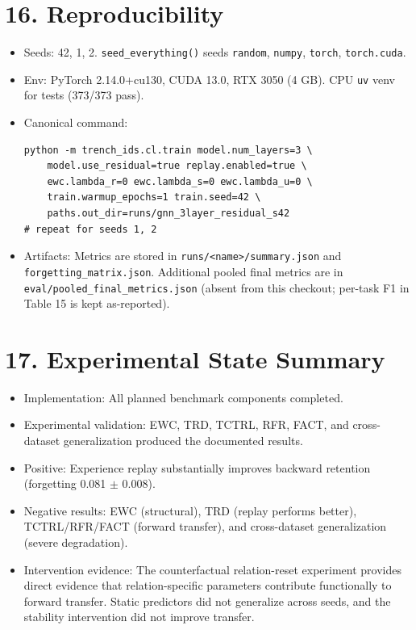 \documentclass[11pt,a4paper]{article}
\begin{document}
\section*{16. Reproducibility}
\begin{itemize}[leftmargin=*]
\item Seeds: 42, 1, 2. \texttt{seed\_everything()} seeds \texttt{random}, \texttt{numpy}, \texttt{torch}, \texttt{torch.cuda}.
\item Env: PyTorch 2.14.0+cu130, CUDA 13.0, RTX 3050 (4 GB). CPU \texttt{uv} venv for tests (373/373 pass).
\item Canonical command:
\begin{verbatim}
python -m trench_ids.cl.train model.num_layers=3 \
    model.use_residual=true replay.enabled=true \
    ewc.lambda_r=0 ewc.lambda_s=0 ewc.lambda_u=0 \
    train.warmup_epochs=1 train.seed=42 \
    paths.out_dir=runs/gnn_3layer_residual_s42
# repeat for seeds 1, 2
\end{verbatim}
\item Artifacts: Metrics are stored in \texttt{runs/<name>/summary.json} and \texttt{forgetting\_matrix.json}.
Additional pooled final metrics are in \texttt{eval/pooled\_final\_metrics.json} (absent from this checkout; per-task F1 in Table 15 is kept as-reported).
\end{itemize}

\section*{17. Experimental State Summary}
\begin{itemize}[leftmargin=*]
\item Implementation: All planned benchmark components completed.
\item Experimental validation: EWC, TRD, TCTRL, RFR, FACT, and cross-dataset generalization produced the documented results.
\item Positive: Experience replay substantially improves backward retention (forgetting \num{0.081} $\pm$ \num{0.008}).
\item Negative results: EWC (structural), TRD (replay performs better), TCTRL/RFR/FACT (forward transfer), and cross-dataset generalization (severe degradation).
\item Intervention evidence: The counterfactual relation-reset experiment provides direct evidence that relation-specific parameters contribute functionally to forward transfer. Static predictors did not generalize across seeds, and the stability intervention did not improve transfer.
\end{itemize}
\end{document}
